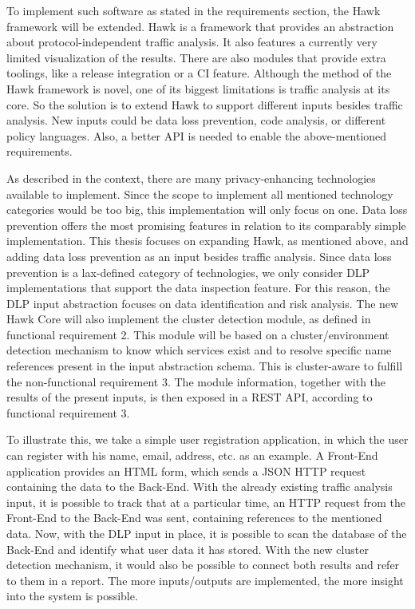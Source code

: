 


\graphicspath{{6/figures/}}

To implement such software as stated in the requirements section, the Hawk framework will be extended. Hawk is a framework that provides an abstraction about protocol-independent traffic analysis. It also features a currently very limited visualization of the results. There are also modules that provide extra toolings, like a release integration or a CI feature.
Although the method of the Hawk framework is novel, one of its biggest limitations is traffic analysis at its core. So the solution is to extend Hawk to support different inputs besides traffic analysis. New inputs could be data loss prevention, code analysis, or different policy languages. Also, a better API is needed to enable the above-mentioned requirements.


As described in the context, there are many privacy-enhancing technologies available to implement. Since the scope to implement all mentioned technology categories would be too big, this implementation will only focus on one. Data loss prevention offers the most promising features in relation to its comparably simple implementation. This thesis focuses on expanding Hawk, as mentioned above, and adding data loss prevention as an input besides traffic analysis. Since data loss prevention is a lax-defined category of technologies, we only consider DLP implementations that support the data inspection feature.
For this reason, the DLP input abstraction focuses on data identification and risk analysis. The new Hawk Core will also implement the cluster detection module, as defined in functional requirement 2. This module will be based on a cluster/environment detection mechanism to know which services exist and to resolve specific name references present in the input abstraction schema. This is cluster-aware to fulfill the non-functional requirement 3. The module information, together with the results of the present inputs, is then exposed in a REST API, according to functional requirement 3.

To illustrate this, we take a simple user registration application, in which the user can register with his name, email, address, etc. as an example. A Front-End application provides an HTML form, which sends a JSON HTTP request containing the data to the Back-End. With the already existing traffic analysis input, it is possible to track that at a particular time, an HTTP request from the Front-End to the Back-End was sent, containing references to the mentioned data. Now, with the DLP input in place, it is possible to scan the database of the Back-End and identify what user data it has stored. With the new cluster detection mechanism, it would also be possible to connect both results and refer to them in a report. The more inputs/outputs are implemented, the more insight into the system is possible.



